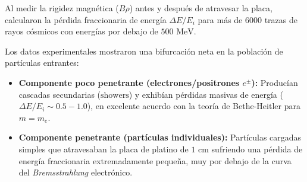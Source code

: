 Al medir la rigidez magnética ($B\rho$) antes y después de atravesar la placa, calcularon la pérdida fraccionaria de energía $\Delta E / E_i$ para más de 6000 trazas de rayos cósmicos con energías por debajo de $500\text{ MeV}$.

\begin{center}
\end{center}

\begin{concepto}
Los datos experimentales mostraron una bifurcación neta en la población de partículas entrantes:
\begin{itemize}
    \item \textbf{Componente poco penetrante (electrones/positrones $e^\pm$):} Producían cascadas secundarias ($\text{showers}$) y exhibían pérdidas masivas de energía ($\Delta E / E_i \sim 0.5 - 1.0$), en excelente acuerdo con la teoría de Bethe-Heitler para $m = m_e$.
    \item \textbf{Componente penetrante (partículas individuales):} Partículas cargadas simples que atravesaban la placa de platino de $1\text{ cm}$ sufriendo una pérdida de energía fraccionaria extremadamente pequeña, muy por debajo de la curva del \emph{Bremsstrahlung} electrónico.
\end{itemize}
\end{concepto}

